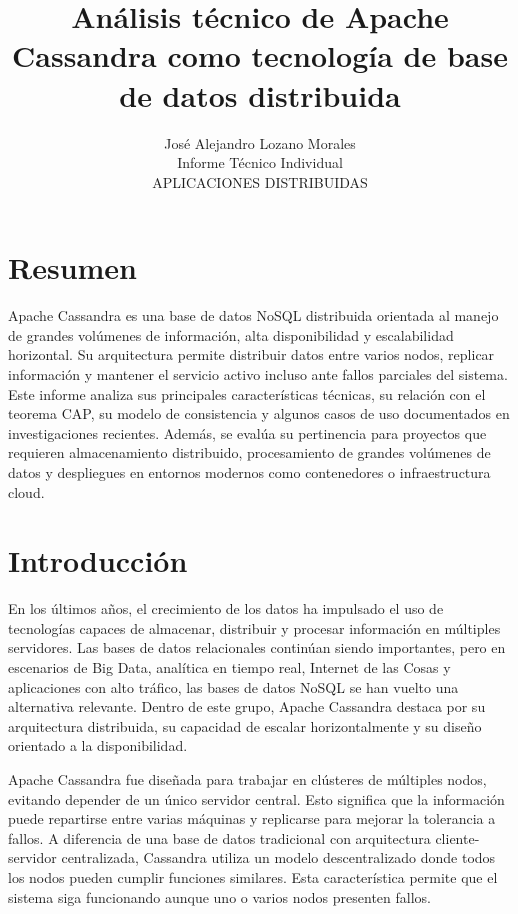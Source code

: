 \documentclass[12pt,a4paper]{article}
\title{\textbf{Análisis técnico de Apache Cassandra como tecnología de base de datos distribuida}}
\author{José Alejandro Lozano Morales\\Informe Técnico Individual\\APLICACIONES DISTRIBUIDAS}
\date{}
\begin{document}
\maketitle

\section*{Resumen}

Apache Cassandra es una base de datos NoSQL distribuida orientada al manejo de grandes volúmenes de información, alta disponibilidad y escalabilidad horizontal. Su arquitectura permite distribuir datos entre varios nodos, replicar información y mantener el servicio activo incluso ante fallos parciales del sistema. Este informe analiza sus principales características técnicas, su relación con el teorema CAP, su modelo de consistencia y algunos casos de uso documentados en investigaciones recientes. Además, se evalúa su pertinencia para proyectos que requieren almacenamiento distribuido, procesamiento de grandes volúmenes de datos y despliegues en entornos modernos como contenedores o infraestructura cloud.

\section{Introducción}

En los últimos años, el crecimiento de los datos ha impulsado el uso de tecnologías capaces de almacenar, distribuir y procesar información en múltiples servidores. Las bases de datos relacionales continúan siendo importantes, pero en escenarios de Big Data, analítica en tiempo real, Internet de las Cosas y aplicaciones con alto tráfico, las bases de datos NoSQL se han vuelto una alternativa relevante. Dentro de este grupo, Apache Cassandra destaca por su arquitectura distribuida, su capacidad de escalar horizontalmente y su diseño orientado a la disponibilidad.

Apache Cassandra fue diseñada para trabajar en clústeres de múltiples nodos, evitando depender de un único servidor central. Esto significa que la información puede repartirse entre varias máquinas y replicarse para mejorar la tolerancia a fallos. A diferencia de una base de datos tradicional con arquitectura cliente-servidor centralizada, Cassandra utiliza un modelo descentralizado donde todos los nodos pueden cumplir funciones similares. Esta característica permite que el sistema siga funcionando aunque uno o varios nodos presenten fallos.
\end{document}
